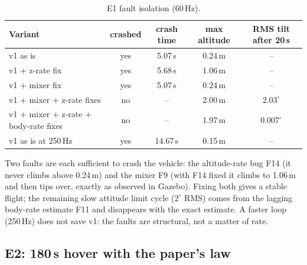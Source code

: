 \begin{table}[H]
\centering\small
\caption{E1 fault isolation (60\,Hz).}
\label{tab:e1}
\begin{tabular}{@{}lcccc@{}}
\toprule
\textbf{Variant} & \textbf{crashed} & \textbf{crash time} & \textbf{max altitude} & \textbf{RMS tilt after 20\,s}\\
\midrule
v1 as is & yes & 5.07\,s & 0.24\,m & --\\
v1 + z-rate fix & yes & 5.68\,s & 1.06\,m & --\\
v1 + mixer fix & yes & 5.07\,s & 0.24\,m & --\\
v1 + mixer + z-rate fixes & no & -- & 2.00\,m & $2.03^\circ$\\
v1 + mixer + z-rate + body-rate fixes & no & -- & 1.97\,m & $0.007^\circ$\\
v1 as is at 250\,Hz & yes & 14.67\,s & 0.15\,m & --\\
\bottomrule
\end{tabular}
\end{table}


\begin{projbox}[conclusion of E1]
Two faults are each sufficient to crash the vehicle: the altitude-rate bug F14 (it never climbs above 0.24\,m) and the
mixer F9 (with F14 fixed it climbs to 1.06\,m and then tips over, exactly as observed in Gazebo). Fixing both gives a
stable flight; the remaining slow attitude limit cycle ($2^\circ$ RMS) comes from the lagging body-rate estimate F11 and
disappears with the exact estimate. A faster loop (250\,Hz) does not save v1: the faults are structural, not a matter of
rate.
\end{projbox}

\subsection{E2: 180\,s hover with the paper's law}


